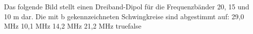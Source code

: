     {Das folgende Bild stellt einen Dreiband-Dipol für die Frequenzbänder 20, 15 und 10 m dar. Die mit b gekennzeichneten Schwingkreise sind abgestimmt auf:}
    {29,0 MHz}
    {10,1 MHz}
    {14,2 MHz}
    {21,2 MHz}
    {true}{false}